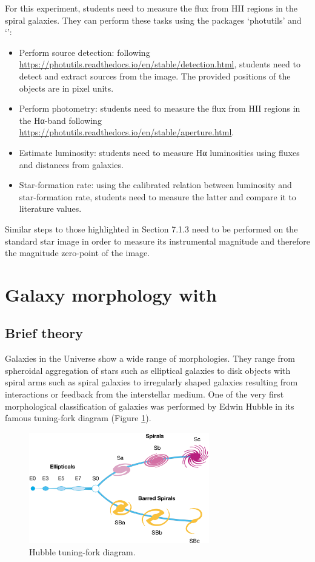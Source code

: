 \documentclass[a4paper, 11pt, fleqn]{memoir}
\begin{document}
For this experiment, students need to measure the flux from HII regions in the spiral galaxies.
They can perform these tasks using the  packages `photutils' and `':
\begin{itemize}
    \item Perform source detection: following \url{https://photutils.readthedocs.io/en/stable/detection.html}, students need to detect and extract sources from the image.
          The provided positions of the objects are in pixel units.
    \item
          Perform photometry: students need to measure the flux from HII regions in the
          Hα-band following
          \url{https://photutils.readthedocs.io/en/stable/aperture.html}.
    \item
          Estimate luminosity: students need to measure Hα luminosities using fluxes and
          distances from galaxies.
    \item
          Star-formation rate: using the calibrated relation between luminosity and
          star-formation rate, students need to measure the latter and compare it to
          literature values.
\end{itemize}

Similar steps to those highlighted in Section 7.1.3 need to be performed on the standard star image in order to measure its instrumental magnitude and therefore the magnitude zero-point of the image.

\section{Galaxy morphology with }

\subsection{Brief theory}

Galaxies in the Universe show a wide range of morphologies.
They range from spheroidal aggregation of stars such as elliptical galaxies to disk objects with spiral arms such as spiral galaxies to irregularly shaped galaxies resulting from interactions or feedback from the interstellar medium.
One of the very first morphological classification of galaxies was performed by Edwin Hubble in its famous tuning-fork diagram (Figure \ref{fig:tuningfork}).

\begin{figure}
    \centering
    \includegraphics[width=0.7\textwidth]{tuningfork}
    \caption{Hubble tuning-fork diagram.}
    \label{fig:tuningfork}
\end{figure}
\end{document}
